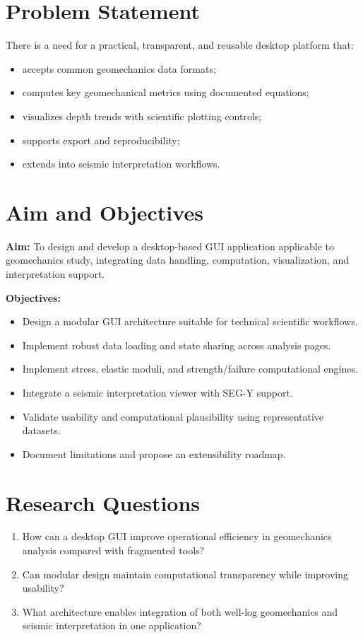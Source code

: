 \documentclass[12pt,a4paper]{report}
\begin{document}
\section{Problem Statement}
There is a need for a practical, transparent, and reusable desktop platform that:
\begin{itemize}
    \item accepts common geomechanics data formats;
    \item computes key geomechanical metrics using documented equations;
    \item visualizes depth trends with scientific plotting controls;
    \item supports export and reproducibility;
    \item extends into seismic interpretation workflows.
\end{itemize}

\section{Aim and Objectives}
\textbf{Aim:} To design and develop a desktop-based GUI application applicable to geomechanics study, integrating data handling, computation, visualization, and interpretation support.

\textbf{Objectives:}
\begin{itemize}
    \item Design a modular GUI architecture suitable for technical scientific workflows.
    \item Implement robust data loading and state sharing across analysis pages.
    \item Implement stress, elastic moduli, and strength/failure computational engines.
    \item Integrate a seismic interpretation viewer with SEG-Y support.
    \item Validate usability and computational plausibility using representative datasets.
    \item Document limitations and propose an extensibility roadmap.
\end{itemize}

\section{Research Questions}
\begin{enumerate}
    \item How can a desktop GUI improve operational efficiency in geomechanics analysis compared with fragmented tools?
    \item Can modular design maintain computational transparency while improving usability?
    \item What architecture enables integration of both well-log geomechanics and seismic interpretation in one application?
\end{enumerate}
\end{document}
